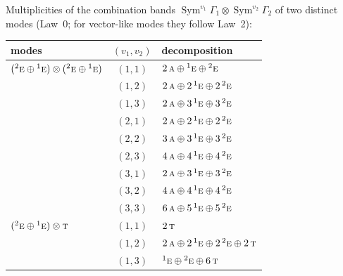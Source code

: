 \documentclass[11pt]{article}
\newcommand{\irr}[1]{\text{\normalfont\scshape #1}}
\newcommand{\conjpair}[1]{{}^{#1}}
\begin{document}
Multiplicities of the combination bands $\operatorname{Sym}^{v_1}\Gamma_1\otimes\operatorname{Sym}^{v_2}\Gamma_2$ of two distinct modes (Law~0; for vector-like modes they follow Law~2):

\begin{longtable}{p{} c p{}}\hline modes & $(v_1,v_2)$ & decomposition\\ \hline\endhead

$(\conjpair{2}\irr{e}\oplus \conjpair{1}\irr{e})\otimes (\conjpair{2}\irr{e}\oplus \conjpair{1}\irr{e})$ & $(1,1)$ & $2\,\irr{a}\oplus \conjpair{1}\irr{e}\oplus \conjpair{2}\irr{e}$\\

 & $(1,2)$ & $2\,\irr{a}\oplus 2\,\conjpair{1}\irr{e}\oplus 2\,\conjpair{2}\irr{e}$\\

 & $(1,3)$ & $2\,\irr{a}\oplus 3\,\conjpair{1}\irr{e}\oplus 3\,\conjpair{2}\irr{e}$\\

 & $(2,1)$ & $2\,\irr{a}\oplus 2\,\conjpair{1}\irr{e}\oplus 2\,\conjpair{2}\irr{e}$\\

 & $(2,2)$ & $3\,\irr{a}\oplus 3\,\conjpair{1}\irr{e}\oplus 3\,\conjpair{2}\irr{e}$\\

 & $(2,3)$ & $4\,\irr{a}\oplus 4\,\conjpair{1}\irr{e}\oplus 4\,\conjpair{2}\irr{e}$\\

 & $(3,1)$ & $2\,\irr{a}\oplus 3\,\conjpair{1}\irr{e}\oplus 3\,\conjpair{2}\irr{e}$\\

 & $(3,2)$ & $4\,\irr{a}\oplus 4\,\conjpair{1}\irr{e}\oplus 4\,\conjpair{2}\irr{e}$\\

 & $(3,3)$ & $6\,\irr{a}\oplus 5\,\conjpair{1}\irr{e}\oplus 5\,\conjpair{2}\irr{e}$\\

\hline

$(\conjpair{2}\irr{e}\oplus \conjpair{1}\irr{e})\otimes \irr{t}$ & $(1,1)$ & $2\,\irr{t}$\\

 & $(1,2)$ & $2\,\irr{a}\oplus 2\,\conjpair{1}\irr{e}\oplus 2\,\conjpair{2}\irr{e}\oplus 2\,\irr{t}$\\

 & $(1,3)$ & $\conjpair{1}\irr{e}\oplus \conjpair{2}\irr{e}\oplus 6\,\irr{t}$\\


\end{longtable}
\end{document}
